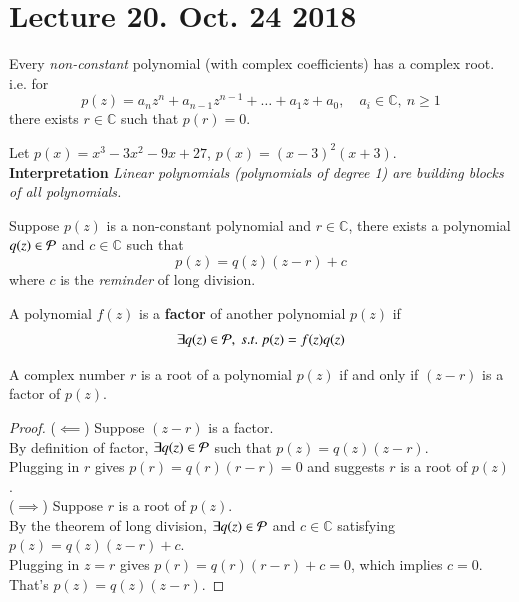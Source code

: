 \documentclass[10pt]{article}
\begin{document}
	\section{Lecture 20. Oct. 24 2018}
	\begin{theorem}
		Every \emph{non-constant} polynomial (with complex coefficients) has a complex root.
		i.e. for 
		\[
			p(z) = a_n z^n + a_{n-1} z^{n-1} + \dots + a_1 z + a_0,\quad a_i \in \mathbb{C},\ n\geq 1
		\]
		there exists $r \in \mathbb{C}$ such that $p(r) = 0$.
	\end{theorem}
	\begin{example}
		Let $p(x) = x^3 -3x^2 - 9x + 27$, $p(x) = (x-3)^2 (x+3)$. \\
		\textbf{Interpretation} \emph{Linear polynomials (polynomials of degree 1) are building blocks of all polynomials.}
	\end{example}
	
	\begin{theorem}
		Suppose $p(z)$ is a non-constant polynomial and $r \in \mathbb{C}$, there exists a polynomial $q(z) \in \mathcal{{P}}$ and $c \in \mathbb{C}$ such that
		\[
			p(z) = q(z)(z-r) + c
		\]
		where $c$ is the \emph{reminder} of long division.
	\end{theorem}
	
	\begin{definition}
		A polynomial $f(z)$ is a \textbf{factor} of another polynomial $p(z)$ if 
		\[
			\exists q(z) \in \mathcal{{P}},\ s.t.\ p(z) = f(z)q(z)
		\]
	\end{definition}
	
	\begin{theorem}
		A complex number $r$ is a root of a polynomial $p(z)$ if and only if $(z-r)$ is a factor of $p(z)$.
	\end{theorem}
	\begin{proof}
		($\impliedby$) Suppose $(z-r)$ is a factor. \\
		By definition of factor, $\exists q(z) \in \mathcal{{P}}$ such that $p(z) = q(z)(z-r)$. \\
		Plugging in $r$ gives $p(r) = q(r)(r-r) = 0$ and suggests $r$ is a root of $p(z)$. \\
		($\implies$) Suppose $r$ is a root of $p(z)$. \\
		By the theorem of long division, $\exists q(z) \in \mathcal{{P}}$ and $c \in \mathbb{C}$ satisfying \\
		$p(z) = q(z)(z-r) + c$. \\
		Plugging in $z=r$ gives $p(r) = q(r)(r-r) + c = 0$, which implies $c=0$. \\
		That's $p(z) = q(z)(z-r)$.
	\end{proof}
	
\end{document}
